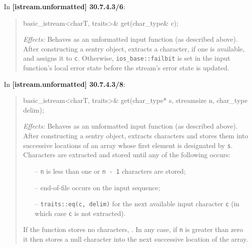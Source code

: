 \documentclass{wg21}
\begin{document}
In \textbf{[istream.unformatted] 30.7.4.3/6}:
\begin{quote}
\begin{codeblock}
basic_istream<charT, traits>& get(char_type& c);
\end{codeblock}
\textit{Effects:} Behaves as an unformatted input function (as described above).
After constructing a sentry object, extracts a character, if one is available,
and assigns it to \texttt{c}. Otherwise, 
{\texttt{ios_base::failbit} is set in the input function's local error state
before the stream's error state is updated}.
\end{quote}

In \textbf{[istream.unformatted] 30.7.4.3/8}:
\begin{quote}
\begin{codeblock}
basic_istream<charT, traits>& get(char_type* s, streamsize n, char_type delim);
\end{codeblock}
\textit{Effects:} Behaves as an unformatted input function (as described above).
After constructing a sentry object, extracts characters and stores them into
successive locations of an array whose first element is designated by \texttt{s}.
Characters are extracted and stored until any of the following occurs:
\begin{itemize}
  \item[--] \texttt{n} is less than one or \texttt{n - 1} characters are stored;
  \item[--] end-of-file occurs on the input sequence;
  \item[--] \texttt{traits::eq(c, delim)} for the next available input character
            \texttt{c} (in which case \texttt{c} is not extracted).
\end{itemize}
If the function stores no characters, . In any case, if \texttt{n} is greater than zero it then stores a
null character into the next successive location of the array.
\end{quote}
\end{document}
